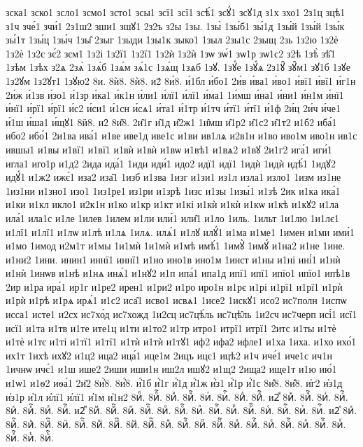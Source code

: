 {зска1
зско1
зсло1
зсмо1
зсто1
зсы1
зсї1
зсї1
зсѣ́1
зсꙋ́1
зсꙋ1д
з1х
зхо1
2з1ц
зцѣ1
з1ч
зче́1
зчи́1
2з1ш2
зши1
зшꙋ1
2з2ъ
з2ы
1зы.
1зы̀
1зы́б1
зы́1д
1зы́й
1зы́й
1зы́к
зы́1т
1зы́ц
1зы́ч
1зы̑
2зыг
1зыди
1зы1к
зыко1
1зыл
2зы1с
2зыщ
2зь
1з2ю
1з2ѐ
1з2ѐ
1з2є
зє́2
зєм1
1з2і
1з2ї1
1з2ї1
1з2ѝ
1з2ѝ
1зѡ
зѡ́1
зѡ1р
зѡ1с2
з2ѣ
1зѣ̀
зѣ̑1
1зѣм
1зѣх
з2ѧ
2зѧ̀
1зѧ́б
1зѧ́м
зѧ́1с
1зѧ́щ
1зѧб
1зꙋ.
1зꙋ́е
1зꙋ́ѧ
2з1ꙋ̑
зꙋ̑м1
зꙋ1б
1зꙋе
1з2ꙋм
1з2ꙋт1
1зꙋю2
8и.
8ѝ8.
8ѝ8.
и2́
8и́8.
и́1бл
и́бо1
2и́в
и́ва1
и́во1
и́вї1
и́вї1
и́г1н
2и́ж
и́1зв
и́зо1
и́1зр
и́ка1
и́к1н
и́ли1
и́лї1
и́лї1
и́ма1
1и́мш
и́на1
и́ни1
и́н1м
и́нї1
и́нї1
и́рї1
и́рї1
и́с2
и́си1
и́1сн
и́сѧ1
и́та1
и́1тр
и́1тч
и́тї1
и́тї1
и́1ф
2и́ц
2и́ч
и́че1
и́1ш
и́ша1
и́щꙋ1
8ӥ8.
и2̑
8и̑8.
2и̑1г
и̑1д
и̑2ж1
1и̑мш
и̑1р2
и̑1с2
и̑1т2
и1б2
иба́1
ибо2
ибо́1
2и1ва
ива́1
и1ве
иве1д
иве1с
и1ви
ив1лѧ
и2в1н
и1во
иво1м
иво1н
ив1с
ившы1
и1вы
и1вї1
и1вї1
и1вѝ
и1вѝ
и1вѡ
и1вѣ1
и1вѧ2
и1вꙋ
2и1г2
ига́1
иги́1
игла1
иго1р
и1д2
2ида
ида́1
1иди
иди́1
идо2
идї1
идї1
1идѝ
1идѝ
идѣ́1
1идꙋ2
идꙋ́1
и1ж2
ижє́1
иза2
иза̑1
1изб
и1зва
1изг
и1зи1
из1л
изла1
изло1
1изм
из1не
1из1ни
и1зно1
изо1
1из1ре1
из1ри
и1зрѣ
1изс
и1зы
1изы́1
и1зѣ
2ик
и1ка
ика́1
и1ки
и1кл
икло1
и2к1н
и1ко
и1кр
и1кт
и1кі
и1кѝ
и1кѝ
и1кѡ
и1кѣ
и1кꙋ2
и1ла
ила́1
ила1с
и1ле
1илев
1илем
и1ли
или́1
или̑1
и1ло
1иль.
1ильт
1и1лю
1и1лє1
и1лї1
и1лї1
и1лѡ
и1лѣ
и1лѧ
1илѧ.
илѧ́1
и1лꙋ
илꙋ́1
и1ма
и1ме1
1имен
и1ми
ими́1
и1мо
1имод
и2м1т
и1мы
1и1мѝ
1и1мѝ
и1мѣ
имѣ́1
1имꙋ̀
1имꙋ́
и1на2
и1не
1ине.
и1ни2
1ини.
инин1
иннї1
иннї1
и1но
ино1в
ино1м
1инст
и1ны
и1ні
ині́1
и1нѝ
и1нѝ
1инѡв
и1нѣ
и1нѧ
инѧ́1
и1нꙋ2
и1п
ипа́1
ипа1д
ипї1
ипї1
ипїо1
ипїо1
ипѣ1в
2ир
и1ра
ира́1
ир1г
и1ре2
ирен1
и1ри2
и1ро
иро1н
и1рє
и1рі
и1рї1
и1рї1
и1рѝ
и1рѝ
и1рѣ
и1рѧ
ирѧ́1
и1с2
иса̑1
исво1
исвѧ1
1исе2
1искꙋ1
исо2
ис7полн
1испѡ
исса1
исте1
и2сх
ис7хо́д
ис7хожд
1и2сц
ис7цѣ́ль
ис7цѣ̑ль
1и2сч
ис7черп
исі́1
исї1
исї1
и1та
и1тв
и1те
ите1ц
и1ти
и1то2
и1тр
итро1
итрї1
итрї1
2итс
и1ты
и1тѐ
и1тѐ
и1тє
и1ті
и1тї1
и1тї1
и1тѝ
и1тѝ
и1тꙋ1
иф2
ифа2
ифле1
и1ха
1иха.
и1хо
ихо́1
их1т
1ихѣ
ихꙋ2
и1ц2
ица2
ица́1
ице1м
2ицъ
ицє1
ицѣ2
и1ч
иче́1
иче1с
ич1н
1ичнѡ
ичє́1
и1ш
ише2
2иши
иши1н
иш2л
ишꙋ2
и1щ2
2ища2
ище1т
и1ю
ию́1
и1ѡ1
и1ѳ2
иѳа́1
2и҃2
8и҆̀8.
8и҆́8.
и҆́1б
и҆́1г
и҆́1д
и҆́1ж
и҆́з1
и҆́1р
и҆́1с
8и҆̈8.
8и҆̑8.
и҆г2
и҆з1д
и҆з1р
и҆1л
и҆лї1
и҆лї1
и҆1м
и҆1н2
8иⷠ.
8иⷠ҇.
8иⷡ.
8иⷡ҇.
8иⷢ.
8иⷢ҇.
8иⷣ.
8иⷣ҇.
и2ⷤ
8иⷤ.
8иⷤ҇.
8иⷥ.
8иⷥ҇.
8иⷦ.
8иⷦ҇.
8иⷧ.
8иⷧ҇.
и2ⷨ
8иⷨ.
8иⷨ҇.
8иⷩ.
8иⷩ҇.
8иⷪ.
8иⷪ҇.
8иⷫ.
8иⷫ҇.
8иⷬ.
8иⷬ҇.
8иⷭ.
8иⷭ҇.
8иⷮ.
8иⷮ҇.
и2ⷯ
8иⷯ.
8иⷯ҇.
8иⷰ.
8иⷰ҇.
8иⷱ.
8иⷱ҇.
8иⷲ.
8иⷲ҇.
8иⷳ.
8иⷳ҇.
8иⷴ.
8иⷴ҇.
8иⷵ.
8иⷵ҇.
8иⷶ.
8иⷶ҇.
8иⷷ.
8иⷷ҇.
8иⷸ.
8иⷸ҇.
8иⷹ.
8иⷹ҇.
8иⷺ.
8иⷺ҇.
}

